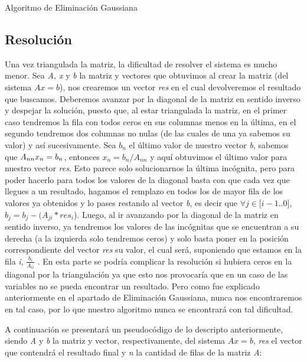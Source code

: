 \documentclass[10pt, a4paper]{article}
\begin{document}
\begin{algorithm}[H]
\caption{Algoritmo de Eliminaci\'on Gaussiana}
\end{algorithm}

\subsection{Resoluci\'on}
	Una vez triangulada la matriz, la dificultad de resolver el sistema es mucho menor. Sea \textit{A, x} y \textit{b} la matriz y vectores que obtuvimos al crear la matriz (del sistema $Ax=b$), nos crearemos un vector \textit{res} en el cual devolveremos el resultado que buscamos. Deberemos avanzar por la diagonal de la matriz en sentido inverso y despejar la solución, puesto que, al estar triangulada la matriz, en el primer caso tendremos la fila con todos ceros en sus columnas menos en la \'ultima, en el segundo tendremos dos columnas no nulas (de las cuales de una ya sabemos su valor) y as\'i sucesivamente. Sea $b_{n}$ el \'ultimo valor de nuestro vector \textit{b}, sabemos que $A_{nn} \* x_{n}=b_{n}$, entonces $x_{n}=b_{n}/A_{nn}$ y aqu\'i obtuvimos el \'ultimo valor para nuestro vector \textit{res}. Esto parece solo solucionarnos la \'ultima inc\'ognita, pero para poder hacerlo para todos los valores de la diagonal basta con que cada vez que llegues a un resultado, hagamos el remplazo en todos los de mayor fila de los valores ya obtenidos y lo pases restando al vector \textit{b}, es decir que $\forall j \in [i-1$..$0]$, $b_{j}=b_{j}-(A_{ji}*res_{i}$). Luego, al ir avanzando por la diagonal de la matriz en sentido inverso, ya tendremos los valores de las inc\'ognitas que se encuentran a su derecha (a la izquierda solo tendremos ceros) y solo basta poner en la posici\'on correspondiente del vector \textit{res} su valor, el cual ser\'a, suponiendo que estamos en la fila \textit{i}, $\frac{b_{i}}{A_{ii}}$ . En esta parte se podría complicar la resoluci\'on si hubiera ceros en la diagonal por la triangulaci\'on ya que esto nos provocar\'ia que en un caso de las variables no se pueda encontrar un resultado. Pero como fue explicado anteriormente en el apartado de Eliminaci\'on Gaussiana, nunca nos encontraremos en tal caso, por lo que nuestro algoritmo nunca se encontrar\'a con tal dificultad.

A continuaci\'on se presentar\'a un pseudoc\'odigo de lo descripto anteriormente, siendo \textit{A} y \textit{b} la matriz y vector, respectivamente, del sistema $Ax=b$, \textit{res} el vector que contendr\'a el resultado final y \textit{n} la cantidad de filas de la matriz \textit{A}:
\end{document}
